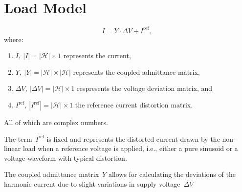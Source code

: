 \section{Load Model} 

\begin{equation}
    I = Y \cdot \Delta V + I^{\text{ref}},
\end{equation}
where:
\begin{enumerate}
    \item $I,~|I|=|\mathcal{H}| \times 1$ represents the current, 
    \item $Y,~|Y|=|\mathcal{H}| \times |\mathcal{H}|$ represents the coupled admittance matrix, 
    \item $\Delta V,~|\Delta V|=|\mathcal{H}| \times 1$ respresents the voltage deviation matrix, and 
    \item $I^{\text{ref}},~|I^{\text{ref}}|=|\mathcal{H}| \times 1$  the reference current distortion matrix.
\end{enumerate}
All of which are complex numbers.

The term~$I^{\text{ref}}$ is fixed and represents the distorted current drawn by the non-linear load when a reference voltage is applied, i.e., either a pure sinusoid or a voltage waveform with typical distortion. 

The coupled admittance matrix~$Y$ allows for calculating the deviations of the harmonic current due to slight variations in supply voltage~$\Delta V$

